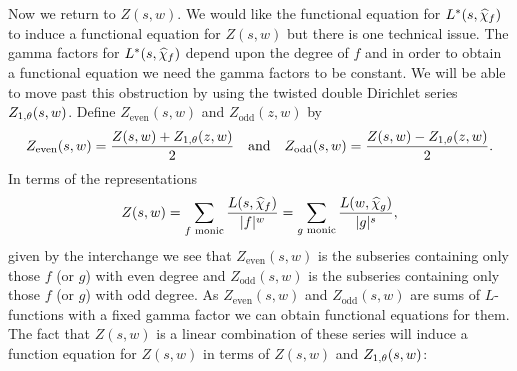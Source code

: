 \documentclass[12pt,reqno,oneside]{amsart}
\begin{document}
    Now we return to $Z(s,w)$. We would like the functional equation for $L^{\ast}(s,\widehat{\chi}_{f})$ to induce a functional equation for $Z(s,w)$ but there is one technical issue. The gamma factors for $L^{\ast}(s,\widehat{\chi}_{f})$ depend upon the degree of $f$ and in order to obtain a functional equation we need the gamma factors to be constant. We will be able to move past this obstruction by using the twisted double Dirichlet series $Z_{1,\theta}(s,w)$. Define $Z_{\text{even}}(s,w)$ and $Z_{\text{odd}}(z,w)$ by
    \[
        Z_{\text{even}}(s,w) = \frac{Z(s,w)+Z_{1,\theta}(z,w)}{2} \quad \text{and} \quad Z_{\text{odd}}(s,w) = \frac{Z(s,w)-{Z_{1,\theta}(z,w)}}{2}.
    \]
    In terms of the representations
    \[
        Z(s,w) = \sum_{\text{$f$ monic}}\frac{L(s,\widehat{\chi}_{f})}{|f|^{w}} = \sum_{\text{$g$ monic}}\frac{L(w,\widehat{\chi}_{g})}{|g|^{s}},
    \]
    given by the interchange we see that $Z_{\text{even}}(s,w)$ is the subseries containing only those $f$ (or $g$) with even degree and $Z_{\text{odd}}(s,w)$ is the subseries containing only those $f$ (or $g$) with odd degree. As $Z_{\text{even}}(s,w)$ and $Z_{\text{odd}}(s,w)$ are sums of $L$-functions with a fixed gamma factor we can obtain functional equations for them. The fact that $Z(s,w)$ is a linear combination of these series will induce a function equation for $Z(s,w)$ in terms of $Z(s,w)$ and $Z_{1,\theta}(s,w)$:
\end{document}
